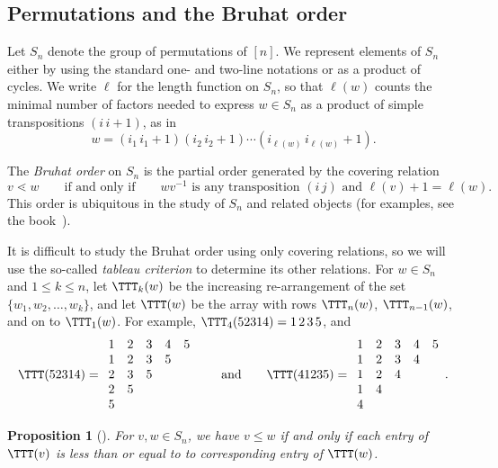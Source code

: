 \documentclass[12pt]{amsart}
\newtheorem{prop}[equation]{Proposition}
\theoremstyle{definition}
\theoremstyle{remark}
\numberwithin{equation}{section}
\begin{document}
\subsection{Permutations and the Bruhat order}
\label{sec:bruhat}

Let $S_n$ denote the group of permutations of $[n]$.  We represent elements of $S_{n}$ either by using the standard one- and two-line notations or as a product of cycles.  We write $\ell$ for the length function on $S_{n}$, so that $\ell(w)$ counts the minimal number of factors needed to express $w \in S_{n}$ as a product of simple transpositions $(i\, i+1)$, as in
\[
w = (i_{1}\, i_{1} + 1)(i_{2}\, i_{2}+1) \cdots (i_{\ell(w)}\, i_{\ell(w)} + 1).
\]

The \emph{Bruhat order} on $S_{n}$ is the partial order generated by the covering relation
\[
v \lessdot w \qquad\text{if and only if} \qquad \text{$wv^{-1}$ is any transposition $(i\,j)$ and $\ell(v) +1 = \ell(w)$}.
\]
This order is ubiquitous in the study of $S_{n}$ and related objects (for examples, see the book~\cite{BjornerBrenti}).

It is difficult to study the Bruhat order using only covering relations, so we will use the so-called \emph{tableau criterion} to determine its other relations.  For $w \in S_{n}$ and $1 \le k \le n$, let $\TTT_{k}(w)$ be the increasing re-arrangement of the set $\{w_{1}, w_{2}, \ldots, w_{k}\}$, and let $\TTT(w)$ be the array with rows $\TTT_{n}(w)$, $\TTT_{n-1}(w)$, and on to $\TTT_{1}(w)$.  For example, $\TTT_{4}(52314) = 1\,2\,3\,5$, and
\[
\TTT(52314) = 
\begin{array}{ccccc} 
1 & 2 & 3 & 4 & 5 \\ 
1 & 2 & 3 & 5 \\ 
2 & 3 & 5 \\ 
2 & 5 \\ 
5
\end{array}
\qquad\text{and}\qquad
\TTT(41235) = \begin{array}{ccccc} 
1 & 2 & 3 & 4 & 5 \\ 
1 & 2 & 3 & 4 \\ 
1 & 2 & 4 \\ 
1 & 4 \\ 
4
\end{array}.
\]

\begin{prop}[{\cite[Theorem 2.6.3]{BjornerBrenti}}]
\label{TableauCriterion}
For $v, w \in S_{n}$, we have $v \le w$  if and only if each entry of $\TTT(v)$ is less than or equal to to corresponding entry of $\TTT(w)$.
\end{prop}
\end{document}

